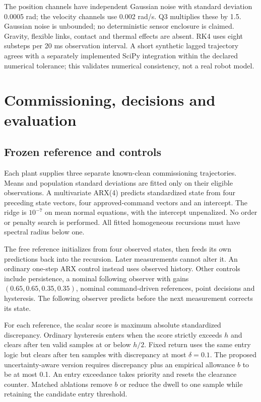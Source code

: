 \documentclass[11pt]{article}
\begin{document}
The position channels have independent Gaussian noise with standard deviation 0.0005 rad; the velocity channels use 0.002 rad/s. Q3 multiplies these by 1.5. Gaussian noise is unbounded; no deterministic sensor enclosure is claimed. Gravity, flexible links, contact and thermal effects are absent. RK4 uses eight substeps per 20 ms observation interval. A short synthetic lagged trajectory agrees with a separately implemented SciPy integration within the declared numerical tolerance; this validates numerical consistency, not a real robot model.

\section{Commissioning, decisions and evaluation}
\subsection{Frozen reference and controls}
Each plant supplies three separate known-clean commissioning trajectories. Means and population standard deviations are fitted only on their eligible observations. A multivariate ARX(4) predicts standardized state from four preceding state vectors, four approved-command vectors and an intercept. The ridge is $10^{-7}$ on mean normal equations, with the intercept unpenalized. No order or penalty search is performed. All fitted homogeneous recursions must have spectral radius below one.

The free reference initializes from four observed states, then feeds its own predictions back into the recursion. Later measurements cannot alter it. An ordinary one-step ARX control instead uses observed history. Other controls include persistence, a nominal following observer with gains $(0.65,0.65,0.35,0.35)$, nominal command-driven references, point decisions and hysteresis. The following observer predicts before the next measurement corrects its state.

For each reference, the scalar score is maximum absolute standardized discrepancy. Ordinary hysteresis enters when the score strictly exceeds $h$ and clears after ten valid samples at or below $h/2$. Fixed return uses the same entry logic but clears after ten samples with discrepancy at most $\delta=0.1$. The proposed uncertainty-aware version requires discrepancy plus an empirical allowance $b$ to be at most 0.1. An entry exceedance takes priority and resets the clearance counter. Matched ablations remove $b$ or reduce the dwell to one sample while retaining the candidate entry threshold.
\end{document}
